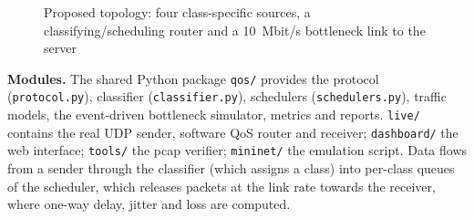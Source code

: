 \documentclass[12pt,a4paper]{article}
\newcommand{\code}[1]{\texttt{#1}}
\begin{document}
\begin{figure}[H]\centering
{}
\caption{Proposed topology: four class-specific sources, a classifying/scheduling router and a
10~Mbit/s bottleneck link to the server}\label{fig:topology}
\end{figure}

\textbf{Modules.} The shared Python package \code{qos/} provides the protocol
(\code{protocol.py}), classifier (\code{classifier.py}), schedulers (\code{schedulers.py}), traffic
models, the event-driven bottleneck simulator, metrics and reports. \code{live/} contains the real
UDP sender, software QoS router and receiver; \code{dashboard/} the web interface; \code{tools/}
the pcap verifier; \code{mininet/} the emulation script. Data flows from a sender through the
classifier (which assigns a class) into per-class queues of the scheduler, which releases packets
at the link rate towards the receiver, where one-way delay, jitter and loss are computed.
\end{document}
